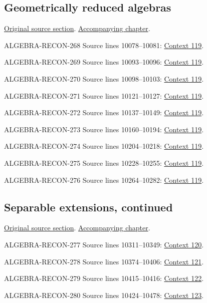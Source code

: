 \subsection{Geometrically reduced algebras}
\hypertarget{algebra-source-section-geometrically-reduced}{}
\noindent\href{https://github.com/stacks/stacks-project/blob/a04446e57ec1fbc252a871afcec7752fb2807b14/algebra.tex\#L10037}{Original source section}. \href{algebra.pdf\#nameddest=section-geometrically-reduced}{Accompanying chapter}.

\begin{AlgebraSourceRoutes}
\item[ALGEBRA-RECON-268] Source lines 10078--10081: \hyperlink{algebra-context-119}{Context 119}.
\item[ALGEBRA-RECON-269] Source lines 10093--10096: \hyperlink{algebra-context-119}{Context 119}.
\item[ALGEBRA-RECON-270] Source lines 10098--10103: \hyperlink{algebra-context-119}{Context 119}.
\item[ALGEBRA-RECON-271] Source lines 10121--10127: \hyperlink{algebra-context-119}{Context 119}.
\item[ALGEBRA-RECON-272] Source lines 10137--10149: \hyperlink{algebra-context-119}{Context 119}.
\item[ALGEBRA-RECON-273] Source lines 10160--10194: \hyperlink{algebra-context-119}{Context 119}.
\item[ALGEBRA-RECON-274] Source lines 10204--10218: \hyperlink{algebra-context-119}{Context 119}.
\item[ALGEBRA-RECON-275] Source lines 10228--10255: \hyperlink{algebra-context-119}{Context 119}.
\item[ALGEBRA-RECON-276] Source lines 10264--10282: \hyperlink{algebra-context-119}{Context 119}.
\end{AlgebraSourceRoutes}

\subsection{Separable extensions, continued}
\hypertarget{algebra-source-section-separability-continued}{}
\noindent\href{https://github.com/stacks/stacks-project/blob/a04446e57ec1fbc252a871afcec7752fb2807b14/algebra.tex\#L10288}{Original source section}. \href{algebra.pdf\#nameddest=section-separability-continued}{Accompanying chapter}.

\begin{AlgebraSourceRoutes}
\item[ALGEBRA-RECON-277] Source lines 10311--10349: \hyperlink{algebra-context-120}{Context 120}.
\item[ALGEBRA-RECON-278] Source lines 10374--10406: \hyperlink{algebra-context-121}{Context 121}.
\item[ALGEBRA-RECON-279] Source lines 10415--10416: \hyperlink{algebra-context-122}{Context 122}.
\item[ALGEBRA-RECON-280] Source lines 10424--10478: \hyperlink{algebra-context-123}{Context 123}.
\end{AlgebraSourceRoutes}

